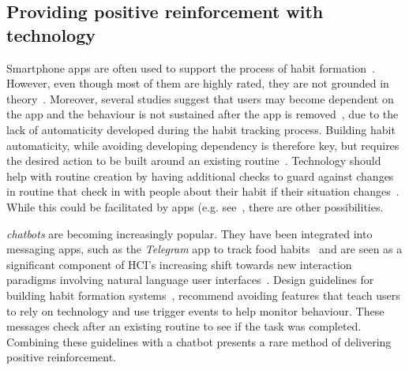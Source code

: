 \documentclass{scaffold/sigchi}
\begin{document}
\subsection{Providing positive reinforcement with technology}
Smartphone apps are often used to support the process of habit formation~\cite{survey_on_current_apps_of_steel}. However, even though most of them are highly rated, they are not grounded in theory~\cite{article_beyond_self_tracking_designing_apps, article_dont_kick_habit}. Moreover, several studies suggest that users may become dependent on the app and the behaviour is not sustained after the app is removed~\cite{survey_on_apps_2,article_dont_kick_habit,article_realtime_feedback_improving_medication_taking}, due to the lack of automaticity developed during the habit tracking process. 
Building habit automaticity, while avoiding developing dependency is therefore key, but requires the desired action to be built around an existing routine~\cite{article_how_habits_formed_modelling_habit_formation, article_implementation_intentions_multicue}. Technology should help with routine creation by having additional checks to guard against changes in routine that check in with people about their habit if their situation changes~\cite{article_dont_forget_your_pill}. While this could be facilitated by apps (e.g. see~\cite{article_beyond_self_tracking_designing_apps}, there are other possibilities.

\textit{chatbots} are becoming increasingly popular. They have been integrated into messaging apps, such as the \textit{Telegram} app to track food habits~\cite{telegram_bot_tracking_habits} and are seen as a significant component of HCI's increasing shift towards new interaction paradigms involving natural language user interfaces~\cite{chatbots_and_new_world_of_hci}. Design guidelines for building habit formation systems~\cite{article_beyond_self_tracking_designing_apps}, recommend avoiding features that teach users to rely on technology and use trigger events to help monitor behaviour. These messages check after an existing routine to see if the task was completed. Combining these guidelines with a chatbot presents a rare method of delivering positive reinforcement.
\end{document}
